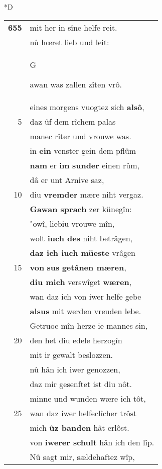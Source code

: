 \documentclass[8pt,a4paper,notitlepage]{article}
\begin{document}
\begin{table}[ht]
\begin{minipage}[t]{0.5\linewidth}
\small
\begin{center}*D
\end{center}
\begin{tabular}{rl}
\textbf{655} & mit her in sîne helfe reit.\\ 
 & nû hœret lieb und leit:\\ 
 & \begin{large}G\end{large}awan was zallen zîten vrô.\\ 
 & eines morgens vuogtez sich \textbf{alsô},\\ 
5 & daz ûf dem rîchem palas\\ 
 & manec rîter und vrouwe was.\\ 
 & in \textbf{ein} venster gein dem pflûm\\ 
 & \textbf{nam} er \textbf{im} \textbf{sunder} einen rûm,\\ 
 & dâ er unt Arnive saz,\\ 
10 & diu \textbf{vremder} mære niht vergaz.\\ 
 & \textbf{Gawan sprach} zer künegîn:\\ 
 & "owî, liebiu vrouwe mîn,\\ 
 & wolt \textbf{iuch des} niht betrâgen,\\ 
 & \textbf{daz ich iuch müeste} vrâgen\\ 
15 & \textbf{von} \textbf{sus} \textbf{getânen mæren},\\ 
 & \textbf{diu mich} verswîget \textbf{wæren},\\ 
 & wan daz ich von iwer helfe gebe\\ 
 & \textbf{alsus} mit werden vreuden lebe.\\ 
 & Getruoc mîn herze ie mannes sin,\\ 
20 & den het diu edele herzogîn\\ 
 & mit ir gewalt beslozzen.\\ 
 & nû hân ich iwer genozzen,\\ 
 & daz mir gesenftet ist diu nôt.\\ 
 & minne und wunden wære ich tôt,\\ 
25 & wan daz iwer helfeclîcher trôst\\ 
 & mich \textbf{ûz banden} hât erlôst.\\ 
 & von \textbf{iwerer schult} hân ich den lîp.\\ 
 & Nû sagt mir, sældehaftez wîp,\\ 

\end{tabular}
\end{minipage}
\end{table}
\end{document}
